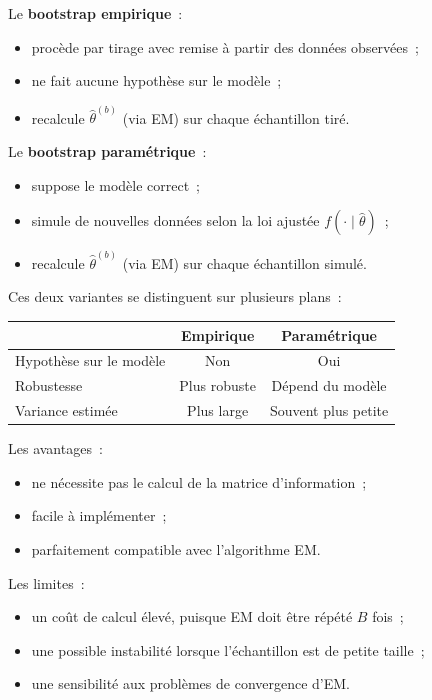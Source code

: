 \begin{mdframed}
\begin{definition}
Le \textbf{bootstrap empirique}~:
\begin{itemize}
  \item procède par tirage avec remise à partir des données observées~;
  \item ne fait aucune hypothèse sur le modèle~;
  \item recalcule $\hat{\theta}^{(b)}$ (via EM) sur chaque échantillon tiré.
\end{itemize}

Le \textbf{bootstrap paramétrique}~:
\begin{itemize}
  \item suppose le modèle correct~;
  \item simule de nouvelles données selon la loi ajustée
        $f(\cdot \mid \hat{\theta})$~;
  \item recalcule $\hat{\theta}^{(b)}$ (via EM) sur chaque échantillon simulé.
\end{itemize}
\end{definition}
\end{mdframed}

Ces deux variantes se distinguent sur plusieurs plans~:

\begin{center}
\begin{tabular}{lcc}
\hline
 & Empirique & Paramétrique \\
\hline
Hypothèse sur le modèle & Non & Oui \\
Robustesse              & Plus robuste & Dépend du modèle \\
Variance estimée        & Plus large & Souvent plus petite \\
\hline
\end{tabular}
\end{center}

\begin{bilan}[Bootstrap]
Les avantages~:
\begin{itemize}
  \item ne nécessite pas le calcul de la matrice d'information~;
  \item facile à implémenter~;
  \item parfaitement compatible avec l'algorithme EM.
\end{itemize}

Les limites~:
\begin{itemize}
  \item un coût de calcul élevé, puisque EM doit être répété $B$ fois~;
  \item une possible instabilité lorsque l'échantillon est de petite taille~;
  \item une sensibilité aux problèmes de convergence d'EM.
\end{itemize}
\end{bilan}
